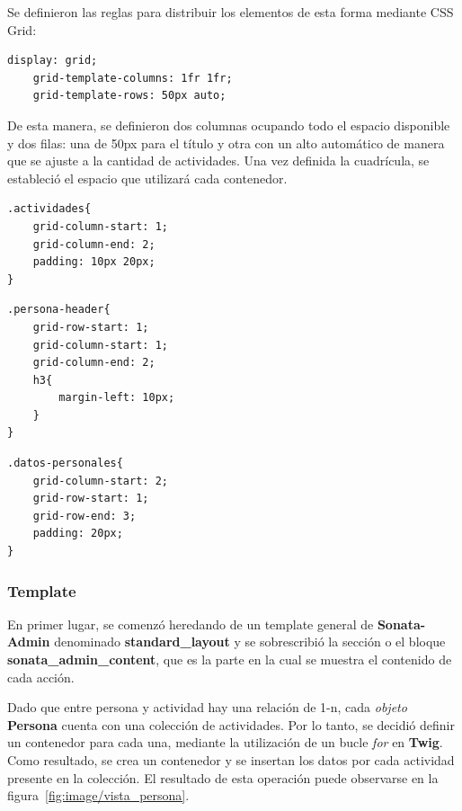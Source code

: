 Se definieron las reglas para distribuir los elementos de esta forma mediante CSS Grid:

\begin{lstlisting}[caption={Definición de filas y columnas de la cuadrícula.\\Fuente: Elaboración propia.}]
    display: grid;
    grid-template-columns: 1fr 1fr;
    grid-template-rows: 50px auto;
\end{lstlisting}

De esta manera, se definieron dos columnas ocupando todo el espacio disponible y dos filas: una de 50px para el título y otra con un alto automático de manera que se ajuste a la
cantidad de actividades\@.  Una vez definida la cuadrícula, se estableció el espacio que utilizará cada contenedor.


\begin{lstlisting}[caption={Orientación del contenedor de actividad en la cuadrícula.\\Fuente: Elaboración propia.}]
.actividades{
    grid-column-start: 1;
    grid-column-end: 2;
    padding: 10px 20px;
}
\end{lstlisting}


\begin{lstlisting}[caption={Orientación del contenedor del título de la accíon.\\Fuente: Elaboración propia.}]
.persona-header{
    grid-row-start: 1;
    grid-column-start: 1;
    grid-column-end: 2;
    h3{
        margin-left: 10px;
    }
}
\end{lstlisting}
\begin{lstlisting}[caption={Orientación del contenedor de datos personales.\\Fuente: Elaboración propia.}]
.datos-personales{
    grid-column-start: 2;
    grid-row-start: 1;
    grid-row-end: 3;
    padding: 20px;
}
\end{lstlisting}

\subsubsection{Template}%
\label{ssub:template}
En primer lugar, se comenzó heredando de un template general de \textbf{Sonata-Admin} denominado \textbf{standard\_layout} y se sobrescribió la sección o el bloque
\textbf{sonata\_admin\_content}, que es la parte en la cual se muestra el contenido de cada acción.



Dado que entre persona y actividad hay una relación de 1-n, cada \textit{objeto} \textbf{Persona} cuenta con una colección de actividades\@. Por lo tanto, se decidió definir
un contenedor para cada una, mediante la utilización de un bucle \textit{for} en \textbf{Twig}. Como resultado, se crea un contenedor y se insertan los datos por cada actividad
presente en la colección\@. El resultado de esta operación puede observarse en la figura~\ref{fig:image/vista_persona}\@.


